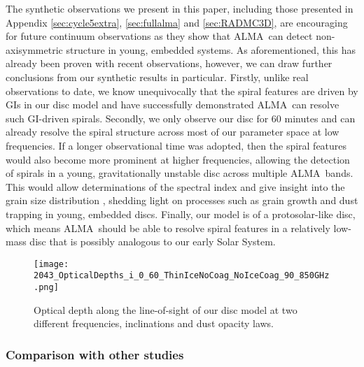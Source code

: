 \documentclass[fleqn,usenatbib]{mnras}
\newcommand{\alma}{ALMA}
\begin{document}
The synthetic observations we present in this paper, including those presented in Appendix \ref{sec:cycle5extra}, \ref{sec:fullalma} and \ref{sec:RADMC3D}, are encouraging for future continuum observations as they show that \alma\ can detect non-axisymmetric structure in young, embedded systems. As aforementioned, this has already been proven with recent observations, however, we can draw further conclusions from our synthetic results in particular. Firstly, unlike real observations to date, we know unequivocally that the spiral features are driven by GIs in our disc model and have successfully demonstrated \alma\ can resolve such GI-driven spirals. Secondly, we only observe our disc for 60 minutes and can already resolve the spiral structure across most of our parameter space at low frequencies. If a longer observational time was adopted, then the spiral features would also become more prominent at higher frequencies, allowing the detection of spirals in a young, gravitationally unstable disc across multiple \alma\ bands. This would allow determinations of the spectral index and give insight into the grain size distribution \citep[e.g.][]{Perez&Carpenter2012}, shedding light on processes such as grain growth and dust trapping \citep[e.g][]{Dipierro&Pinilla2015} in young, embedded discs. Finally, our model is of a protosolar-like disc, which means \alma\ should be able to resolve spiral features in a relatively low-mass disc that is possibly analogous to our early Solar System.

\begin{figure*}
    \texttt{[image: 2043\_OpticalDepths\_i\_0\_60\_ThinIceNoCoag\_NoIceCoag\_90\_850GHz.png]}
    \caption{Optical depth along the line-of-sight of our disc model at two different frequencies, inclinations and dust opacity laws.}
    \label{fig:opticaldepths}
\end{figure*}

\subsubsection{Comparison with other studies}
\end{document}

